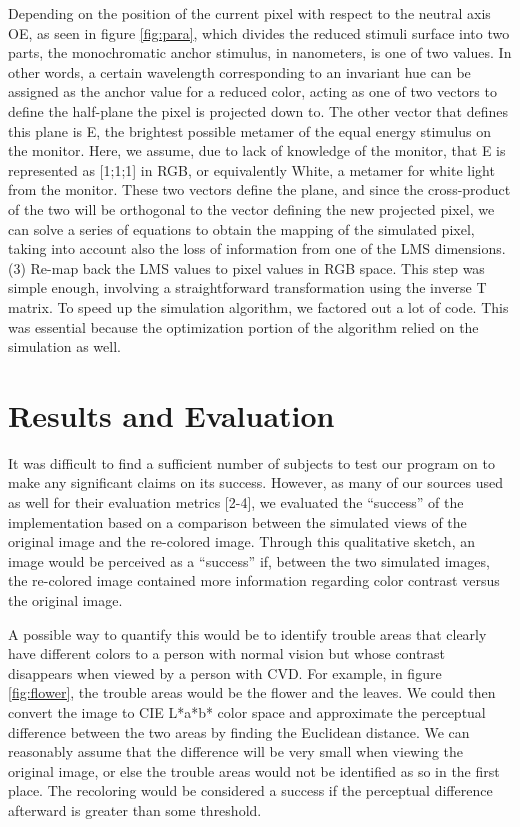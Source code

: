 \documentclass[10pt,twocolumn,letterpaper]{article}
\begin{document}
Depending on the position of the current pixel with respect to the neutral axis OE, as seen in figure \ref{fig:para}, which divides the reduced stimuli surface into two parts, the monochromatic anchor stimulus, in nanometers, is one of two values. In other words, a certain wavelength corresponding to an invariant hue can be assigned as the anchor value for a reduced color, acting as one of two vectors to define the half-plane the pixel is projected down to. The other vector that defines this plane is E, the brightest possible metamer of the equal energy stimulus on the monitor. Here, we assume, due to lack of knowledge of the monitor, that E is represented as [1;1;1] in RGB, or equivalently White, a metamer for white light from the monitor. These two vectors define the plane, and since the cross-product of the two will be orthogonal to the vector defining the new projected pixel, we can solve a series of equations to obtain the mapping of the simulated pixel, taking into account also the loss of information from one of the LMS dimensions. 
(3) 	Re-map back the LMS values to pixel values in RGB space.  This step was simple enough, involving a straightforward transformation using the inverse T matrix. To speed up the simulation algorithm, we factored out a lot of code. This was essential because the optimization portion of the algorithm relied on the simulation as well. 

\section{Results and Evaluation}

It was difficult to find a sufficient number of subjects to test our program on to make any significant claims on its success. However, as many of our sources used as well for their evaluation metrics [2-4], we evaluated the ``success'' of the implementation based on a comparison between the simulated views of the original image and the re-colored image. Through this qualitative sketch, an image would be perceived as a ``success'' if, between the two simulated images, the re-colored image contained more information regarding color contrast versus the original image. 

A possible way to quantify this would be to identify trouble areas that clearly have different colors to a person with normal vision but whose contrast disappears when viewed by a person with CVD. For example, in figure \ref{fig:flower}, the trouble areas would be the flower and the leaves. We could then convert the image to CIE L*a*b* color space and approximate the perceptual difference between the two areas by finding the Euclidean distance. We can reasonably assume that the difference will be very small when viewing the original image, or else the trouble areas would not be identified as so in the first place. The recoloring would be considered a success if the perceptual difference afterward is greater than some threshold.
\end{document}
